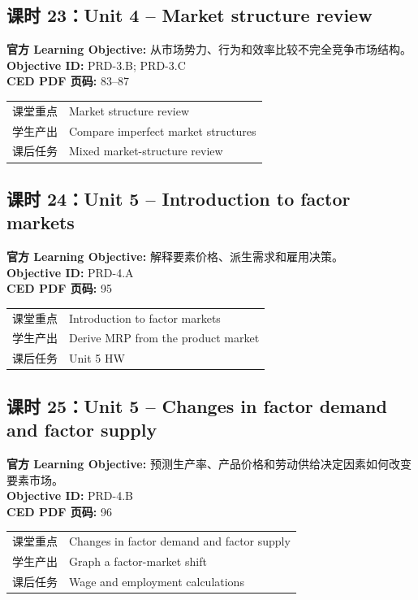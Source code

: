 \documentclass[11pt,a4paper]{ctexart}
\newcommand{\objectivebox}[1]{\noindent\colorbox{aplight}{\parbox{0.96\textwidth}{#1}}}
\begin{document}
\subsection{课时 23：Unit 4 -- Market structure review}
\objectivebox{\textbf{官方 Learning Objective:} 从市场势力、行为和效率比较不完全竞争市场结构。\\\textbf{Objective ID:} PRD-3.B; PRD-3.C\\\textbf{CED PDF 页码:} 83–87}\par\vspace{0.4em}
\begin{tabularx}{\textwidth}{p{3.0cm}Y}
\toprule
课堂重点 & Market structure review\\
学生产出 & Compare imperfect market structures\\
课后任务 & Mixed market-structure review\\
\bottomrule
\end{tabularx}
\subsection{课时 24：Unit 5 -- Introduction to factor markets}
\objectivebox{\textbf{官方 Learning Objective:} 解释要素价格、派生需求和雇用决策。\\\textbf{Objective ID:} PRD-4.A\\\textbf{CED PDF 页码:} 95}\par\vspace{0.4em}
\begin{tabularx}{\textwidth}{p{3.0cm}Y}
\toprule
课堂重点 & Introduction to factor markets\\
学生产出 & Derive MRP from the product market\\
课后任务 & Unit 5 HW\\
\bottomrule
\end{tabularx}
\newpage
\subsection{课时 25：Unit 5 -- Changes in factor demand and factor supply}
\objectivebox{\textbf{官方 Learning Objective:} 预测生产率、产品价格和劳动供给决定因素如何改变要素市场。\\\textbf{Objective ID:} PRD-4.B\\\textbf{CED PDF 页码:} 96}\par\vspace{0.4em}
\begin{tabularx}{\textwidth}{p{3.0cm}Y}
\toprule
课堂重点 & Changes in factor demand and factor supply\\
学生产出 & Graph a factor-market shift\\
课后任务 & Wage and employment calculations\\
\bottomrule
\end{tabularx}
\end{document}
